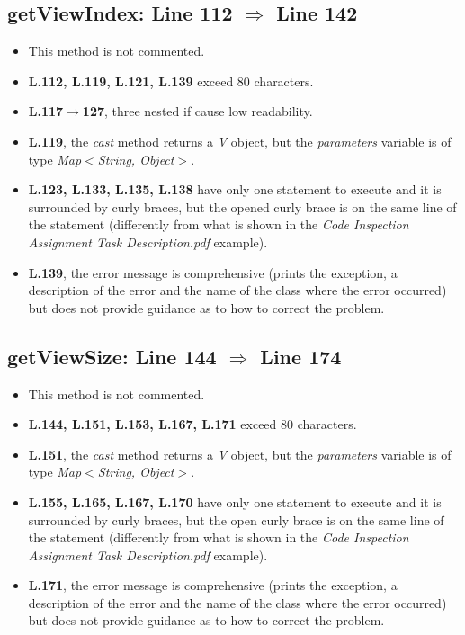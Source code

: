 \subsection{getViewIndex: Line 112 $\Rightarrow$ Line 142}
\begin{itemize}
	\item This method is not commented.
	\item \textbf{L.112, L.119, L.121, L.139} exceed 80 characters.
	\item \textbf{L.117$\rightarrow$127}, three nested if cause low readability.
	\item \textbf{L.119}, the \textit{cast} method returns a \textit{V} object, but the \textit{parameters} variable is of type \textit{Map\(<\)String, Object\(>\)}.
	\item \textbf{L.123, L.133, L.135, L.138} have only one statement to execute and it is surrounded by curly braces, but the opened curly brace is on the same line of the statement (differently from what is shown in the \textit{Code Inspection Assignment Task Description.pdf} example).
	\item \textbf{L.139}, the error message is comprehensive (prints the exception, a description of the error and the name of the class where the error occurred) but does not provide guidance as to how to correct the problem.
\end{itemize}

\subsection{getViewSize: Line 144 $\Rightarrow$ Line 174}
\begin{itemize}
	\item This method is not commented.
	\item \textbf{L.144, L.151, L.153, L.167, L.171} exceed 80 characters. 
	\item \textbf{L.151}, the \textit{cast} method returns a \textit{V} object, but the \textit{parameters} variable is of type \textit{Map\(<\)String, Object\(>\)}.
	\item \textbf{L.155, L.165, L.167, L.170} have only one statement to execute and it is surrounded by curly braces, but the open curly brace is on the same line of the statement (differently from what is shown in the \textit{Code Inspection Assignment Task Description.pdf} example).
	\item \textbf{L.171}, the error message is comprehensive (prints the exception, a description of the error and the name of the class where the error occurred) but does not provide guidance as to how to correct the problem.
\end{itemize}


